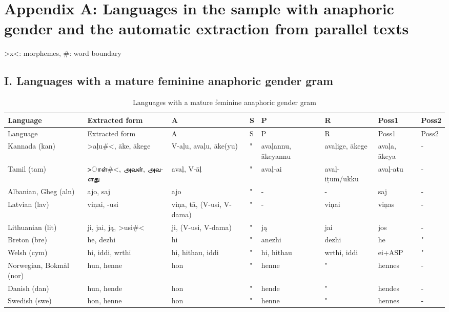
\section*{Appendix A: Languages in the sample with anaphoric gender and the automatic extraction from parallel texts}

\noindent >x<: morphemes, \#: word boundary

\subsection*{I. Languages with a mature feminine anaphoric gender gram \normalfont [128 languages]}

\begin{landscape}
\tiny
\begin{longtable}{*{8}{l}}
\caption{Languages with a mature feminine anaphoric gender gram}\\
\lsptoprule  Language &  Extracted form &  A &  S &  P &  R &  Poss1 &  Poss2\\\midrule\endfirsthead
\midrule     Language &  Extracted form &  A &  S &  P &  R &  Poss1 &  Poss2\\\midrule\endhead
\endfoot
\lspbottomrule\endlastfoot
Kannada (kan)	&	>aḷu\#<, āke, ākege	&	V-aḷu, avaḷu, āke(yu)	&	"	&	avaḷannu, ākeyannu	&	avaḷige, ākege 	&	avaḷa, ākeya 	&	 -	\\
Tamil (tam)	&\texttamil{>ாள்\#<, அவள், {அவளது}}&	avaḷ, V-āḷ	&	"	&	avaḷ-ai	&	avaḷ-iṭum/ukku	&	avaḷ-atu	&	 -	\\
Albanian, Gheg (aln)	&	ajo, saj	&	ajo	&	"	&	 -	&	 -	&	saj	&	 -	\\
Latvian (lav)	&	viņai, {-usi}	&	viņa, tā, (V-usi, V-dama)	&	"	&	 -	&	viņai	&	viņas	&	 -	\\
Lithuanian (lit)	&	ji, jai, ją, {>usi\#<}	&	ji, (V-usi, V-dama)	&	"	&	ją	&	jai	&	jos	&	 -	\\
Breton (bre)	&	he, dezhi	&	hi	&	"	&	anezhi	&	dezhi	&	he	&	"	\\
Welsh (cym)	&	hi, iddi, {wrthi}	&	hi, hithau, iddi	&	"	&	hi, hithau	&	wrthi, iddi	&	ei+ASP	&	"	\\
Norwegian, Bokmål (nor)	&	hun, henne	&	hon	&	"	&	henne	&	"	&	hennes	&	 -	\\
Danish (dan)	&	hun, hende	&	hon	&	"	&	hende	&	"	&	hendes	&	 -	\\
Swedish (swe)	&	hon, henne	&	hon	&	"	&	henne	&	"	&	hennes	&	 -	\\

\end{longtable}
\end{landscape}
